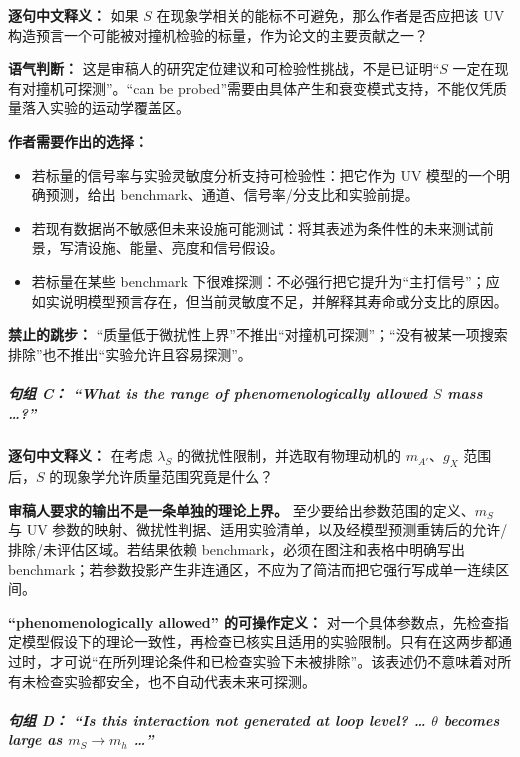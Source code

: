 \documentclass[
  chinese,
  UTF8]{ctexart}
\providecommand{\tightlist}{%
  \setlength{\itemsep}{0pt}\setlength{\parskip}{0pt}}
\begin{document}
\textbf{逐句中文释义：} 如果 \(S\)
在现象学相关的能标不可避免，那么作者是否应把该 UV
构造预言一个可能被对撞机检验的标量，作为论文的主要贡献之一？

\textbf{语气判断：}
这是审稿人的研究定位建议和可检验性挑战，不是已证明``\(S\)
一定在现有对撞机可探测''。``can be
probed''需要由具体产生和衰变模式支持，不能仅凭质量落入实验的运动学覆盖区。

\textbf{作者需要作出的选择：}

\begin{itemize}
\tightlist
\item
  若标量的信号率与实验灵敏度分析支持可检验性：把它作为 UV
  模型的一个明确预测，给出 benchmark、通道、信号率/分支比和实验前提。
\item
  若现有数据尚不敏感但未来设施可能测试：将其表述为条件性的未来测试前景，写清设施、能量、亮度和信号假设。
\item
  若标量在某些 benchmark
  下很难探测：不必强行把它提升为``主打信号''；应如实说明模型预言存在，但当前灵敏度不足，并解释其寿命或分支比的原因。
\end{itemize}

\textbf{禁止的跳步：}
``质量低于微扰性上界''不推出``对撞机可探测''；``没有被某一项搜索排除''也不推出``实验允许且容易探测''。

\subparagraph{\texorpdfstring{句组 C： ``What is the range of
phenomenologically allowed \(S\) mass
\ldots?''}{句组 C： ``What is the range of phenomenologically allowed S mass \ldots?''}}\label{ux53e5ux7ec4-c-what-is-the-range-of-phenomenologically-allowed-s-mass}

\textbf{逐句中文释义：} 在考虑 \(\lambda_S\)
的微扰性限制，并选取有物理动机的 \(m_{A'}\)、\(g_X\) 范围后，\(S\)
的现象学允许质量范围究竟是什么？

\textbf{审稿人要求的输出不是一条单独的理论上界。}
至少要给出参数范围的定义、\(m_S\) 与 UV
参数的映射、微扰性判据、适用实验清单，以及经模型预测重铸后的允许/排除/未评估区域。若结果依赖
benchmark，必须在图注和表格中明确写出
benchmark；若参数投影产生非连通区，不应为了简洁而把它强行写成单一连续区间。

\textbf{``phenomenologically allowed'' 的可操作定义：}
对一个具体参数点，先检查指定模型假设下的理论一致性，再检查已核实且适用的实验限制。只有在这两步都通过时，才可说``在所列理论条件和已检查实验下未被排除''。该表述仍不意味着对所有未检查实验都安全，也不自动代表未来可探测。

\subparagraph{\texorpdfstring{句组 D： ``Is this interaction not
generated at loop level? \ldots{} \(\theta\) becomes large as
\(m_S\to m_h\)
\ldots''}{句组 D： ``Is this interaction not generated at loop level? \ldots{} \textbackslash theta becomes large as m\_S\textbackslash to m\_h \ldots''}}\label{ux53e5ux7ec4-d-is-this-interaction-not-generated-at-loop-level-theta-becomes-large-as-m_sto-m_h}
\end{document}
